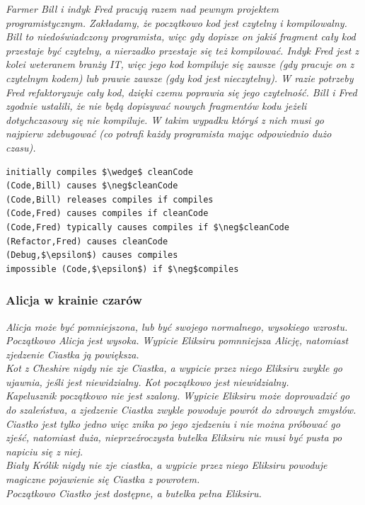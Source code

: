 \documentclass{article}
\begin{document}
\textit{Farmer Bill i indyk Fred pracują razem nad pewnym projektem programistycznym. Zakładamy, że początkowo kod jest czytelny i kompilowalny. Bill to niedoświadczony programista, więc gdy dopisze on jakiś fragment cały kod przestaje być czytelny, a nierzadko przestaje się też kompilować. Indyk Fred jest z kolei weteranem branży IT, więc jego kod kompiluje się zawsze (gdy pracuje on z czytelnym kodem) lub prawie zawsze (gdy kod jest nieczytelny). W razie potrzeby Fred refaktoryzuje cały kod, dzięki czemu poprawia się jego czytelność. Bill i Fred zgodnie ustalili, że nie będą dopisywać nowych fragmentów kodu jeżeli dotychczasowy się nie kompiluje. W takim wypadku któryś z nich musi go najpierw zdebugować (co potrafi każdy programista mając odpowiednio dużo czasu).}

\bigskip
{}
\begin{lstlisting}[mathescape=true]
initially compiles $\wedge$ cleanCode
(Code,Bill) causes $\neg$cleanCode
(Code,Bill) releases compiles if compiles
(Code,Fred) causes compiles if cleanCode
(Code,Fred) typically causes compiles if $\neg$cleanCode
(Refactor,Fred) causes cleanCode
(Debug,$\epsilon$) causes compiles
impossible (Code,$\epsilon$) if $\neg$compiles
\end{lstlisting}

\subsubsection{Alicja w krainie czarów}


\textit{Alicja może być pomniejszona, lub być swojego normalnego, wysokiego wzrostu. Początkowo Alicja jest wysoka. Wypicie Eliksiru pomnniejsza Alicję, natomiast zjedzenie Ciastka ją powiększa.
\\
Kot z Cheshire nigdy nie zje Ciastka, a wypicie przez niego Eliksiru zwykle go ujawnia, jeśli jest niewidzialny. Kot początkowo jest niewidzialny.
\\
Kapelusznik początkowo nie jest szalony. Wypicie Eliksiru może doprowadzić go do szaleństwa, a zjedzenie Ciastka zwykle powoduje powrót do zdrowych zmysłów.
\\
Ciastko jest tylko jedno więc znika po jego zjedzeniu i nie można próbować go zjeść, natomiast duża, nieprzeźroczysta butelka Eliksiru nie musi być pusta po napiciu się z niej.
\\
Biały Królik nigdy nie zje ciastka, a wypicie przez niego Eliksiru powoduje magiczne pojawienie się Ciastka z powrotem.
\\
Początkowo Ciastko jest dostępne, a butelka pełna Eliksiru.}
\end{document}

